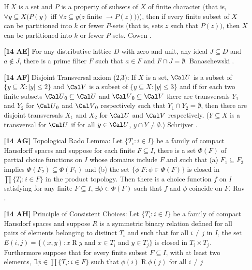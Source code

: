 If $X$ is a set and $P$ is a property of subsets of $X$ of finite character
(that is, $\forall y\subseteq X (P(y)$ iff $\forall z\subseteq y (z$
finite $\rightarrow  P(z)))$), then if every finite subset of $X$ can be
partitioned into $k$ or fewer $P$-sets (that is,
sets $z$ such that $P(z))$, then $X$ can be  partitioned into
$k$ or fewer $P$-sets.  \ac{Cowen} \cite{1982}.
\smallskip
\item{}{\bf [14 AE]}  For any distributive lattice $D$ with zero and unit,
any ideal $J \subseteq  D$ and $a \not\in  J$, there is a prime filter $F$
such that $a \in  F$ and $F \cap  J = \emptyset$.  \ac{Banaschewski}
\cite{1981}.
\smallskip
\item{}{\bf [14 AF]}  Disjoint Transversal axiom (2,3):  If $X$ is a  set,
${\Cal U}$ is a subset of $\{y\subseteq X : | y|\le 2\}$ and ${\Cal V}$
is a subset of $\{y\subseteq X: | y|\le 3\}$ and if for each two finite
subsets ${\Cal U}_{0}\subseteq{\Cal U}$ and ${\Cal V}_{0}\subseteq{\Cal V}$
there are transversals $Y_{1}$ and $Y_{2}$ for ${\Cal U}_{0}$  and
${\Cal V}_{0}$ respectively such that $Y_{1}\cap Y_{2}=\emptyset$, then
there are  disjoint transversals $X_{1}$ and $X_{2}$ for ${\Cal U}$ and
${\Cal V}$ respectively. ($Y\subseteq X$ is a transversal for ${\Cal U}$
if for all $y\in{\Cal U}$, $y\cap Y\neq\emptyset$.)  \ac{Schrijver}
\cite{1978}.
\smallskip
\item{}{\bf [14 AG]}  Topological Rado Lemma:  Let $\{T_i: i\in I\}$
be a family of compact Hausdorff spaces and suppose for each finite
$F\subseteq I$, there is a set $\Phi(F)$ of partial choice functions
on $I$ whose domains include $F$ and such that (a) $F_1\subseteq F_2$
implies $\Phi(F_2)\subseteq\Phi(F_{1})$ and (b) the set
$\{\phi\vert F: \phi\in\Phi(F)\}$ is closed in $\prod\{T_i: i\in F\}$ in
the product topology. Then there is a choice function $f$ on $I$
satisfying for any finite $F\subseteq I$, $\exists\phi\in\Phi(F)$ such
that $f$ and $\phi$ coincide on $F$.  \ac{Rav} \cite{1977}.
\smallskip
\item{}{\bf [14 AH]} Principle of Consistent Choices: Let $\{T_i:
i\in I\}$ be a family of compact Hausdorf spaces and suppose $R$ is a
symmetric binary relation defined for all pairs of elements belonging
to distinct $T_i$ and such that for all $i\neq j$ in $I$, the set
$E(i,j)=\{(x,y): x\mathrel R y$ and $x\in T_i$ and $y\in T_j\}$ is
closed in $T_i\times T_j$. Furthermore suppose that for every finite
subset $F\subseteq I$, with at least two elements, $\exists\phi\in\prod
\{T_i:i\in F\}$ such that $\phi(i)\mathrel R\phi(j)$ for all $i\neq j$
